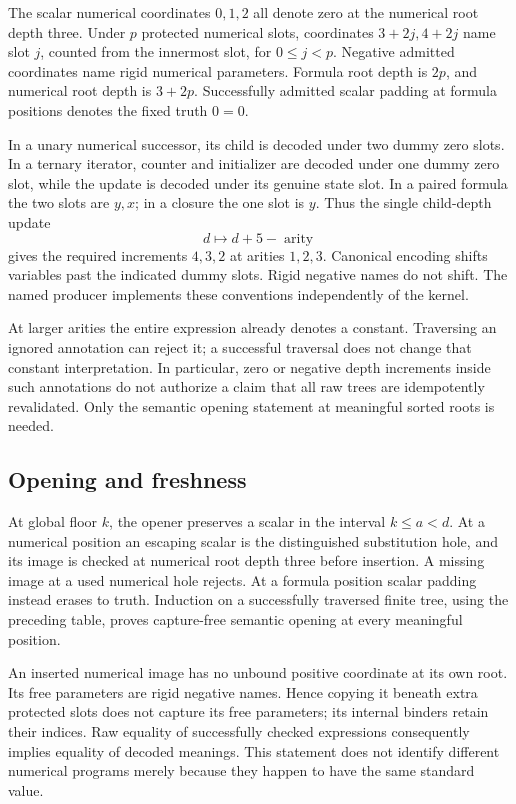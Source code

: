 The scalar numerical coordinates $0,1,2$ all denote zero at the
numerical root depth three. Under $p$ protected numerical slots,
coordinates $3+2j,4+2j$ name slot $j$, counted from the innermost slot,
for $0\leq j<p$. Negative admitted coordinates name rigid numerical
parameters. Formula root depth is $2p$, and numerical root depth is
$3+2p$. Successfully admitted scalar padding at formula positions denotes
the fixed truth $0=0$.

In a unary numerical successor, its child is decoded under two dummy
zero slots. In a ternary iterator, counter and initializer are decoded
under one dummy zero slot, while the update is decoded under its genuine
state slot. In a paired formula the two slots are $y,x$; in a closure
the one slot is $y$. Thus the single child-depth update
\[
                    d\longmapsto d+5-\operatorname{arity}
\]
gives the required increments $4,3,2$ at arities $1,2,3$.
Canonical encoding shifts variables past the indicated dummy slots.
Rigid negative names do not shift. The named producer implements these
conventions independently of the kernel.

At larger arities the entire expression already denotes a constant.
Traversing an ignored annotation can reject it; a successful traversal
does not change that constant interpretation. In particular, zero or
negative depth increments inside such annotations do not authorize a
claim that all raw trees are idempotently revalidated. Only the semantic
opening statement at meaningful sorted roots is needed.

\subsection{Opening and freshness}

At global floor $k$, the opener preserves a scalar in the interval
$k\leq a<d$. At a numerical position an escaping scalar is the
distinguished substitution hole, and its image is checked at numerical
root depth three before insertion. A missing image at a used numerical
hole rejects. At a formula position scalar padding instead erases to
truth. Induction on a successfully traversed finite tree, using the
preceding table, proves capture-free semantic opening at every
meaningful position.

An inserted numerical image has no unbound positive coordinate at its
own root. Its free parameters are rigid negative names. Hence copying
it beneath extra protected slots does not capture its free parameters;
its internal binders retain their indices. Raw equality of successfully
checked expressions consequently implies equality of decoded meanings.
This statement does not identify different numerical programs merely
because they happen to have the same standard value.

